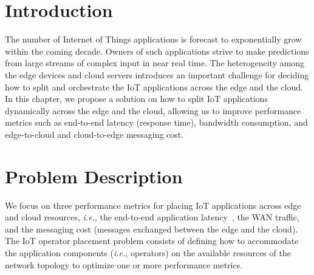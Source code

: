 \section{Introduction}

The number of Internet of Things applications is forecast to exponentially grow within the coming decade. Owners of such applications strive to make predictions from large streams of complex input in near real time. The heterogeneity among the edge devices and cloud servers introduces an important challenge for deciding how to split and orchestrate the IoT applications across the edge and the cloud. In this chapter, we propose a solution on how to split IoT applications dynamically across the edge and the cloud, allowing us to improve performance metrics such as end-to-end latency (response time), bandwidth consumption, and edge-to-cloud and cloud-to-edge messaging cost. 


\section{Problem Description}
We focus on three performance metrics for placing \ac{IoT} applications across edge and cloud resources, \textit{i.e.}, the end-to-end application latency~\cite{daSilvaVeith:2018}, the WAN traffic, and the messaging cost (messages exchanged between the edge and the cloud). The \ac{IoT} operator placement problem consists of defining how to accommodate the application components (\textit{i.e.}, operators) on the available resources of the network topology to optimize one or more performance metrics. 

